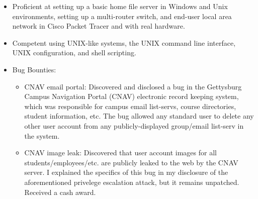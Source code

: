 \documentclass[11pt]{article}
\begin{document}
\begin{itemize}
\item Proficient at setting up a basic home file server in Windows and Unix environments, setting up a multi-router switch, and end-user local area network in Cisco Packet Tracer and with real hardware.
\item Competent using UNIX-like systems, the UNIX command line interface, UNIX configuration, and shell scripting. 
\item Bug Bounties:
\begin{itemize}
	\item CNAV email portal: Discovered and disclosed a bug in the  Gettysburg Campus Navigation Portal (CNAV) electronic record keeping system, which was responsible for campus email list-servs, course directories, student information, etc. The bug allowed any standard user to delete any other user account from any publicly-displayed group/email list-serv in the system.
	\item CNAV image leak: Discovered that user account images for all students/employees/etc. are publicly leaked to the web by the CNAV server. I explained the specifics of this bug in my disclosure of the aforementioned privelege escalation attack, but it remains unpatched. Received a cash award.
\end{itemize}
\end{itemize}
\end{document}
